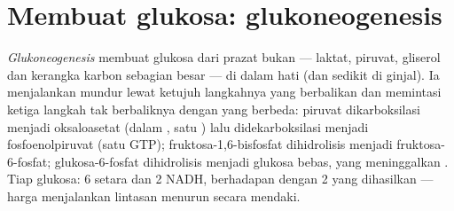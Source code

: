 \section{Membuat glukosa: glukoneogenesis}

\begin{definition}[Glukoneogenesis]\label{def:b1:biosyntheses-integration:gluconeogenesis}
\emph{Glukoneogenesis} membuat glukosa dari prazat bukan 
--- laktat, piruvat, gliserol dan kerangka karbon sebagian besar  --- di dalam hati (dan sedikit di ginjal). Ia menjalankan
 mundur lewat ketujuh langkahnya yang berbalikan dan
memintasi ketiga langkah tak berbaliknya dengan  yang berbeda:
piruvat dikarboksilasi menjadi oksaloasetat (dalam , satu
) lalu didekarboksilasi menjadi fosfoenolpiruvat (satu GTP);
fruktosa-1,6-bisfosfat dihidrolisis menjadi fruktosa-6-fosfat;
glukosa-6-fosfat dihidrolisis menjadi glukosa bebas, yang meninggalkan
. Tiap glukosa: 6 setara  dan 2 NADH, berhadapan dengan 2 
yang dihasilkan  --- harga menjalankan lintasan menurun secara
mendaki.
\end{definition}

